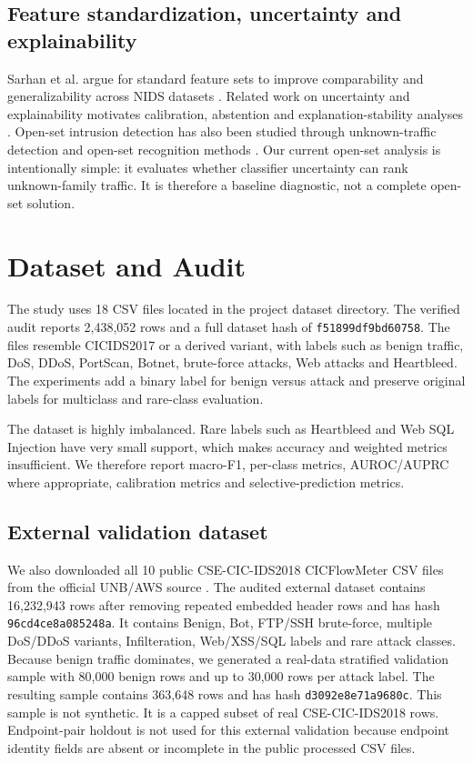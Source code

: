 \documentclass[11pt,a4paper]{article}
\begin{document}
\subsection{Feature standardization, uncertainty and explainability}

Sarhan et al. argue for standard feature sets to improve comparability and generalizability across NIDS datasets \cite{sarhan2021standardfeatures,sarhan2022generalisability}. Related work on uncertainty and explainability motivates calibration, abstention and explanation-stability analyses \cite{talpini2024uncertainty,mohale2025xai}. Open-set intrusion detection has also been studied through unknown-traffic detection and open-set recognition methods \cite{openmax2025intrusion}. Our current open-set analysis is intentionally simple: it evaluates whether classifier uncertainty can rank unknown-family traffic. It is therefore a baseline diagnostic, not a complete open-set solution.

\section{Dataset and Audit}

The study uses 18 CSV files located in the project dataset directory. The verified audit reports 2,438,052 rows and a full dataset hash of \texttt{f51899df9bd60758}. The files resemble CICIDS2017 or a derived variant, with labels such as benign traffic, DoS, DDoS, PortScan, Botnet, brute-force attacks, Web attacks and Heartbleed. The experiments add a binary label for benign versus attack and preserve original labels for multiclass and rare-class evaluation.

The dataset is highly imbalanced. Rare labels such as Heartbleed and Web SQL Injection have very small support, which makes accuracy and weighted metrics insufficient. We therefore report macro-F1, per-class metrics, AUROC/AUPRC where appropriate, calibration metrics and selective-prediction metrics.

\subsection{External validation dataset}

We also downloaded all 10 public CSE-CIC-IDS2018 CICFlowMeter CSV files from the official UNB/AWS source \cite{unbCSECICIDS2018}. The audited external dataset contains 16,232,943 rows after removing repeated embedded header rows and has hash \texttt{96cd4ce8a085248a}. It contains Benign, Bot, FTP/SSH brute-force, multiple DoS/DDoS variants, Infilteration, Web/XSS/SQL labels and rare attack classes. Because benign traffic dominates, we generated a real-data stratified validation sample with 80,000 benign rows and up to 30,000 rows per attack label. The resulting sample contains 363,648 rows and has hash \texttt{d3092e8e71a9680c}. This sample is not synthetic. It is a capped subset of real CSE-CIC-IDS2018 rows. Endpoint-pair holdout is not used for this external validation because endpoint identity fields are absent or incomplete in the public processed CSV files.
\end{document}
